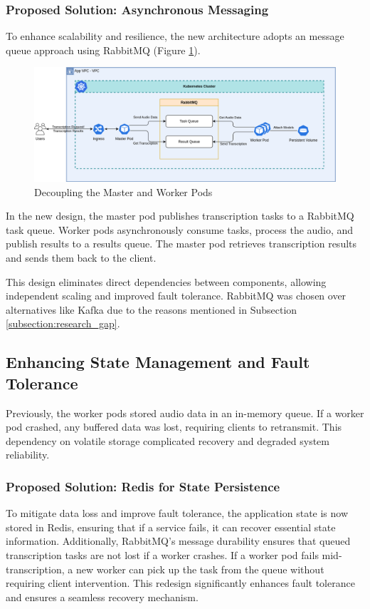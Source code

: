 \subsubsection{Proposed Solution: Asynchronous Messaging}
To enhance scalability and resilience, the new architecture adopts an message queue approach using RabbitMQ (Figure \ref{fig:decouple}).
\begin{figure}[!ht]
    \centering
    \includegraphics[width=\textwidth]{figures/decouple.drawio.png}
    \caption{Decoupling the Master and Worker Pods}
    \label{fig:decouple}
\end{figure}

In the new design, the master pod publishes transcription tasks to a RabbitMQ task queue. Worker pods asynchronously consume tasks, process the audio, and publish results to a results queue. The master pod retrieves transcription results and sends them back to the client.

This design eliminates direct dependencies between components, allowing independent scaling and improved fault tolerance. RabbitMQ was chosen over alternatives like Kafka due to the reasons mentioned in Subsection \ref{subsection:research_gap}.

\subsection{Enhancing State Management and Fault Tolerance}
Previously, the worker pods stored audio data in an in-memory queue. If a worker pod crashed, any buffered data was lost, requiring clients to retransmit. This dependency on volatile storage complicated recovery and degraded system reliability.

\subsubsection{Proposed Solution: Redis for State Persistence}
To mitigate data loss and improve fault tolerance, the application state is now stored in Redis, ensuring that if a service fails, it can recover essential state information. Additionally, RabbitMQ’s message durability ensures that queued transcription tasks are not lost if a worker crashes. If a worker pod fails mid-transcription, a new worker can pick up the task from the queue without requiring client intervention. This redesign significantly enhances fault tolerance and ensures a seamless recovery mechanism.

